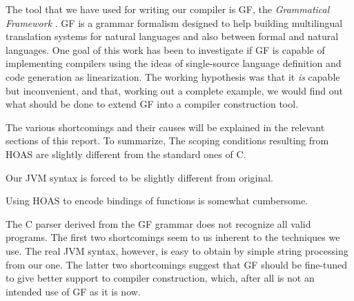 \documentclass[12pt]{article}
\newcommand{\empha}[1]{{\em #1}}
\begin{document}
The tool that we have used for writing our compiler is GF, the
\empha{Grammatical Framework} \cite{gf-jfp}. GF 
is a grammar formalism designed to help building multilingual
translation systems for natural languages and also
between formal and natural languages. One goal of this work
has been to investigate if GF is capable of implementing
compilers using the ideas of single-source language definition
and code generation as linearization. The working hypothesis
was that it \textit{is} capable but inconvenient, and that,
working out a complete example, we would find out what 
should be done to extend GF into a compiler construction tool.

The various shortcomings and their causes will be explained in 
the relevant sections of this report. To summarize,
\bequ
The scoping conditions resulting from HOAS are slightly different
from the standard ones of C.

Our JVM syntax is forced to be slightly different from original.

Using HOAS to encode bindings of functions is somewhat cumbersome.

The C parser derived from the GF grammar does not recognize all
valid programs.
\enqu
The first two shortcomings seem to us inherent to the techniques
we use. The real JVM syntax, however, is easy to obtain by simple
string processing from our one. The latter two shortcomings
suggest that GF should be fine-tuned to give better support
to compiler construction, which, after all is not an intended
use of GF as it is now.
\end{document}

